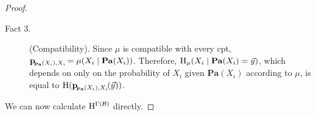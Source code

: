 \documentclass{article}
\newcommand{\bp}[1][L]{\mat{p}_{\!_#1\!}}
\newcommand\Pa{\mathbf{Pa}}
\numberwithin{equation}{section}
\begin{document}
\begin{proof}
\begin{description}
			\item[Fact 3.] (Compatibility). Since $\mu$ is compatible with every cpt, $\bp[\Pa(X_i),X_i] = \mu(X_i \mid \Pa(X_i))$. Therefore, $\H_\mu(X_i \mid \Pa(X_i) = \vec y) $, which depends on only on the probability of $X_i$ given $\Pa(X_i)$ according to $\mu$, is equal to $\H(\bp[\Pa(X_i),X_i](\vec y))$. 
		\end{description}
		We can now calculate $\mathrm{H}^{\Gamma(\cal B)}$ directly.
		
		

\end{proof}
\end{document}
